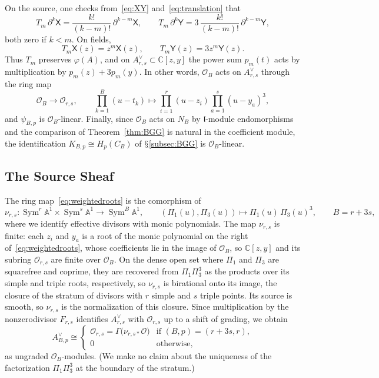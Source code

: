 \documentclass[11pt]{amsart}
\numberwithin{equation}{section}
\renewcommand{\S}{\mbox{$\mathsection$}}
\theoremstyle{definition}
\theoremstyle{remark}
\newcommand{\C}{\mathbb{C}}
\newcommand{\A}{\mathbb{A}}
\newcommand{\lie}{\mathfrak{l}}
\newcommand{\dd}{\partial}
\newcommand{\cO}{\mathcal{O}}
\newcommand{\Xc}{\mathsf{X}}
\newcommand{\Yc}{\mathsf{Y}}
\newcommand{\Sym}{\operatorname{Sym}}
\begin{document}
On the source, one checks from~\eqref{eq:XY} and~\eqref{eq:translation} that
\begin{equation}\label{eq:Tm-modes}
T_m\,\dd^k\Xc=\frac{k!}{(k-m)!}\,\dd^{k-m}\Xc,\qquad T_m\,\dd^k\Yc=3\,\frac{k!}{(k-m)!}\,\dd^{k-m}\Yc,
\end{equation}
both zero if $k<m$. On fields,
\begin{equation}\label{eq:Tm-fields}
T_m\Xc(z)=z^m\Xc(z),\qquad T_m\Yc(z)=3z^m\Yc(z).
\end{equation} Thus $T_m$ preserves $\varphi(A)$, and on $A^\vee_{r,s}\subset\C[z,y]$ the power sum $p_m(t)$ acts by multiplication by $p_m(z)+3p_m(y)$. In other words, $\cO_B$ acts on $A^\vee_{r,s}$ through the ring map
\begin{equation}\label{eq:weightedroots}
\cO_B\longrightarrow\cO_{r,s},\qquad \prod_{k=1}^B(u-t_k)\longmapsto\prod_{i=1}^r(u-z_i)\prod_{a=1}^s(u-y_a)^3,
\end{equation}
and $\psi_{B,p}$ is $\cO_B$-linear. Finally, since $\cO_B$ acts on $N_B$ by $\lie$-module endomorphisms and the comparison of Theorem~\ref{thm:BGG} is natural in the coefficient module, the identification $K_{B,p}\cong H_p(C_B)$ of \S\ref{subsec:BGG} is $\cO_B$-linear.

\subsection{The Source Sheaf}\label{subsec:source}
The ring map~\eqref{eq:weightedroots} is the comorphism of
\begin{equation}\label{eq:nu}
\nu_{r,s}:\Sym^r\A^1\times\Sym^s\A^1\longrightarrow\Sym^B\A^1,\qquad (\Pi_1(u),\Pi_3(u))\longmapsto \Pi_1(u)\,\Pi_3(u)^3,\qquad B=r+3s,
\end{equation}
where we identify effective divisors with monic polynomials. The map $\nu_{r,s}$ is finite: each $z_i$ and $y_a$ is a root of the monic polynomial on the right of~\eqref{eq:weightedroots}, whose coefficients lie in the image of $\cO_B$, so $\C[z,y]$ and its subring $\cO_{r,s}$ are finite over $\cO_B$. On the dense open set where $\Pi_1$ and $\Pi_3$ are squarefree and coprime, they are recovered from $\Pi_1\Pi_3^3$ as the products over its simple and triple roots, respectively, so $\nu_{r,s}$ is birational onto its image, the closure of the stratum of divisors with $r$ simple and $s$ triple points. Its source is smooth, so $\nu_{r,s}$ is the normalization of this closure. Since multiplication by the nonzerodivisor $F_{r,s}$ identifies $A^\vee_{r,s}$ with $\cO_{r,s}$ up to a shift of grading, we obtain
\begin{equation}\label{eq:sourcesheaf}
A^\vee_{B,p}\cong\begin{cases}\cO_{r,s}=\Gamma\bigl(\nu_{r,s*}\cO\bigr)&\text{if }(B,p)=(r+3s,r),\\ 0&\text{otherwise,}\end{cases}
\end{equation}
as ungraded $\cO_B$-modules. (We make no claim about the uniqueness of the factorization $\Pi_1\Pi_3^3$ at the boundary of the stratum.)
\end{document}
